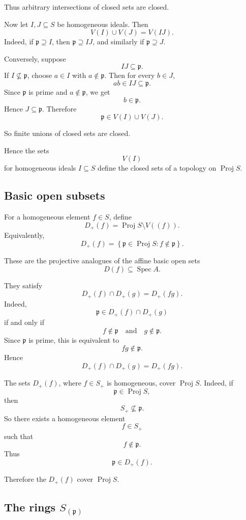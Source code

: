 Thus arbitrary intersections of closed sets are closed.

Now let \(I,J\subseteq S\) be homogeneous ideals. Then
\[
V(I)\cup V(J)=V(IJ).
\]
Indeed, if \(\mathfrak p\supseteq I\), then \(\mathfrak p\supseteq IJ\), and similarly if
\(\mathfrak p\supseteq J\).

Conversely, suppose
\[
IJ\subseteq \mathfrak p.
\]
If \(I\not\subseteq \mathfrak p\), choose \(a\in I\) with \(a\notin \mathfrak p\). Then for every
\(b\in J\),
\[
ab\in IJ\subseteq \mathfrak p.
\]
Since \(\mathfrak p\) is prime and \(a\notin \mathfrak p\), we get
\[
b\in \mathfrak p.
\]
Hence \(J\subseteq \mathfrak p\). Therefore
\[
\mathfrak p\in V(I)\cup V(J).
\]

So finite unions of closed sets are closed.

Hence the sets
\[
V(I)
\]
for homogeneous ideals \(I\subseteq S\) define the closed sets of a topology on
\(\operatorname{Proj} S\).

\subsection{Basic open subsets}

For a homogeneous element \(f\in S\), define
\[
D_+(f)
=
\operatorname{Proj} S\setminus V((f)).
\]
Equivalently,
\[
D_+(f)
=
\left\{
\mathfrak p\in \operatorname{Proj} S : f\notin \mathfrak p
\right\}.
\]

These are the projective analogues of the affine basic open sets
\[
D(f)\subseteq \operatorname{Spec} A.
\]

They satisfy
\[
D_+(f)\cap D_+(g)=D_+(fg).
\]
Indeed,
\[
\mathfrak p\in D_+(f)\cap D_+(g)
\]
if and only if
\[
f\notin \mathfrak p
\quad\text{and}\quad
g\notin \mathfrak p.
\]
Since \(\mathfrak p\) is prime, this is equivalent to
\[
fg\notin \mathfrak p.
\]
Hence
\[
D_+(f)\cap D_+(g)=D_+(fg).
\]

The sets \(D_+(f)\), where \(f\in S_+\) is homogeneous, cover \(\operatorname{Proj} S\). Indeed, if
\[
\mathfrak p\in \operatorname{Proj} S,
\]
then
\[
S_+\not\subseteq \mathfrak p.
\]
So there exists a homogeneous element
\[
f\in S_+
\]
such that
\[
f\notin \mathfrak p.
\]
Thus
\[
\mathfrak p\in D_+(f).
\]

Therefore the \(D_+(f)\) cover \(\operatorname{Proj} S\).

\subsection{The rings \texorpdfstring{$S_{(\mathfrak p)}$}{S(p)}}


